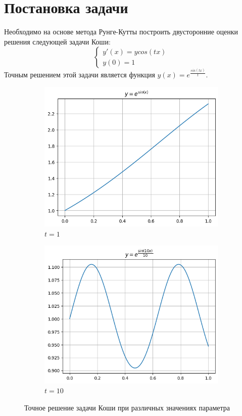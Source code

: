 \section{Постановка задачи}
Необходимо на основе метода Рунге-Кутты построить двусторонние оценки решения следующей задачи Коши:
$$
\begin{cases}
	y'(x) = y cos(tx) \\
	y(0) = 1
\end{cases}
$$
Точным решением этой задачи является функция $y(x) = e^{\frac{sin(tx)}{t}}$.
\begin{figure}[H]
	\centering
	\begin{subfigure}{0.45\textwidth}
		\centering
		\includegraphics[width=\linewidth]{img/exact/exact1.png}
		\caption{$t = 1$}
	\end{subfigure}
	\hfill
	\begin{subfigure}{0.45\textwidth}
		\centering
		\includegraphics[width=\linewidth]{img/exact/exact2.png}
		\caption{$t = 10$}
	\end{subfigure}
	\caption{Точное решение задачи Коши при различных значениях параметра}
	\label{fig:two_graphs}
\end{figure}

